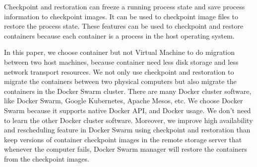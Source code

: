 Checkpoint and restoration can freeze a running process state and save process information to checkpoint images. It can be used to checkpoint image files to restore the process state. These features can be used to checkpoint and restore containers because each container is a process in the host operating system.

In this paper, we choose container but not Virtual Machine to do migration between two host machines, because container need less disk storage and less network transport resources. We not only use checkpoint and restoration to migrate the containers between two physical computers but also migrate the containers in the Docker Swarm cluster.
There are many Docker cluster software, like Docker Swarm, Google Kubernetes, Apache Mesos, etc. We choose Docker Swarm because it supports native Docker API, and Docker usage. We don't need to learn the other Docker cluster software.
Moreover, we improve high availability and rescheduling feature in Docker Swarm using checkpoint and restoration than keep versions of container checkpoint images in the remote storage server that whenever the computer fails, Docker Swarm manager will restore the containers from the checkpoint images.
